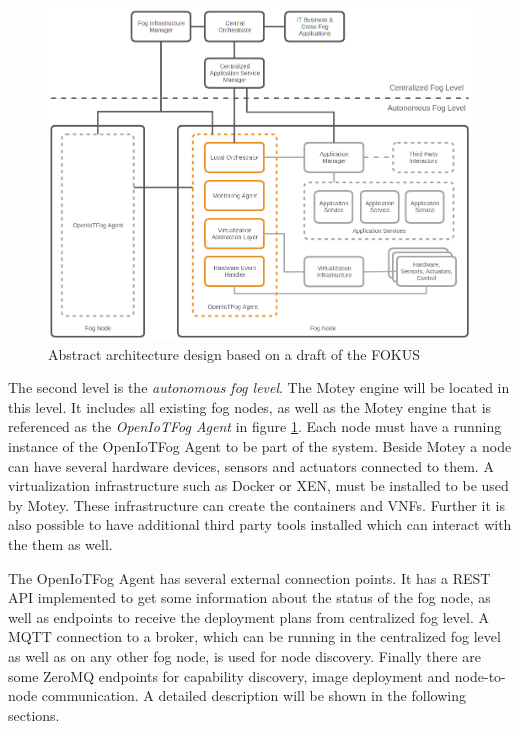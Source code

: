 \begin{figure}[H]
    \centering
    \includegraphics[width=\textwidth]{resources/images/initial_structure.png}
    \caption[Abstract architecture design based on a draft of the FOKUS]{Abstract architecture design based on a draft of the \ac{FOKUS}}
    \label{fig:abstract_architecture_design}
\end{figure}

The second level is the \textit{autonomous fog level}.
The Motey engine will be located in this level.
It includes all existing fog nodes, as well as the Motey engine that is referenced as the \textit{OpenIoTFog Agent} in figure \ref{fig:abstract_architecture_design}.
Each node must have a running instance of the OpenIoTFog Agent to be part of the system.
Beside Motey a node can have several hardware devices, sensors and actuators connected to them.
A virtualization infrastructure such as Docker or XEN, must be installed to be used by Motey.
These infrastructure can create the containers and \acp{VNF}.
Further it is also possible to have additional third party tools installed which can interact with the them as well.

The OpenIoTFog Agent has several external connection points.
It has a \ac{REST} \ac{API} implemented to get some information about the status of the fog node, as well as endpoints to receive the deployment plans from centralized fog level.
A \ac{MQTT} connection to a broker, which can be running in the centralized fog level as well as on any other fog node, is used for node discovery.
Finally there are some ZeroMQ endpoints for capability discovery, image deployment and node-to-node communication.
A detailed description will be shown in the following sections.

